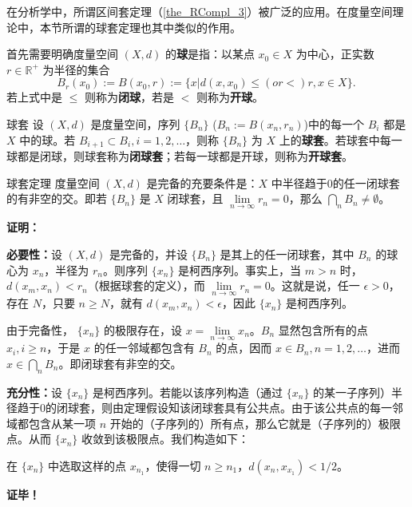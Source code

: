 在分析学中，所谓区间套定理（\autoref{the_RCompl_3}）被广泛的应用。在度量空间理论中，本节所谓的球套定理也其中类似的作用。

首先需要明确度量空间 $(X,d)$ 的\textbf{球}是指：以某点 $x_0\in X$ 为中心，正实数 $r\in\mathbb R^+$ 为半径的集合 
\begin{equation}
B_{r}(x_0):=B(x_0,r):=\{x|d(x,x_0)\leq(or <)r,x\in X\}.~
\end{equation}
若上式中是 $\leq$ 则称为\textbf{闭球}，若是 $<$ 则称为\textbf{开球}。
\begin{definition}{球套}
设 $(X,d)$ 是度量空间，序列 $\{B_n\}$ ($B_n:=B(x_n,r_n)$)中的每一个 $B_i$ 都是 $X$ 中的球。若 $B_{i+1}\subset B_{i},i=1,2,\ldots$，则称 $\{B_n\}$ 为 $X$ 上的\textbf{球套}。若球套中每一球都是闭球，则球套称为\textbf{闭球套}；若每一球都是开球，则称为\textbf{开球套}。
\end{definition}

\begin{theorem}{球套定理}
度量空间 $(X,d)$ 是完备的充要条件是：$X$ 中半径趋于0的任一闭球套的有非空的交。即若 $\{B_n\}$ 是 $X$ 闭球套，且 $\lim\limits_{n\rightarrow\infty}r_n=0$，那么 $\bigcap\limits_n B_n\neq\emptyset$。
\end{theorem}

\textbf{证明：}

\textbf{必要性：}设 $(X,d)$ 是完备的，并设 $\{B_n\}$ 是其上的任一闭球套，其中 $B_n$ 的球心为 $x_n$，半径为 $r_n$。则序列 $\{x_n\}$ 是柯西序列。事实上，当 $m>n$ 时，$d(x_m,x_n)<r_n$（根据球套的定义），而 $\lim\limits_{n\rightarrow\infty}r_n=0$。这就是说，任一 $\epsilon>0$，存在 $N$，只要 $n\geq N$，就有 $d(x_m,x_n)<\epsilon$，因此 $\{x_n\}$ 是柯西序列。

由于完备性， $\{x_n\}$ 的极限存在，设 $x=\lim\limits_{n\rightarrow\infty}x_n$。$B_n$ 显然包含所有的点 $x_i,i\geq n$，于是 $x$ 的任一邻域都包含有 $B_n$ 的点，因而 $x\in B_n,n=1,2,\ldots$，进而
$x\in\bigcap\limits_n B_n$。即闭球套有非空的交。

\textbf{充分性：}设 $\{x_n\}$ 是柯西序列。若能以该序列构造（通过 $\{x_n\}$ 的某一子序列）半径趋于0的闭球套，则由定理假设知该闭球套具有公共点。由于该公共点的每一邻域都包含从某一项 $n$ 开始的（子序列的）所有点，那么它就是（子序列的）极限点。从而 $\{x_n\}$ 收敛到该极限点。我们构造如下：

在 $\{x_n\}$ 中选取这样的点 $x_{n_1}$，使得一切 $n\geq n_1$，$d(x_n,x_{x_1})<1/2$。

\textbf{证毕！}









